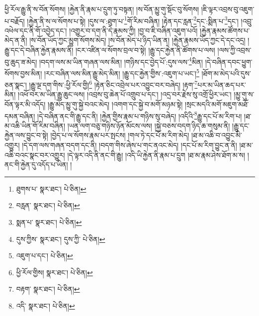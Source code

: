 ཕྱི་རོལ་རྒྱུ་ནི་ས་བོན་སོགས། །རྐྱེན་ནི་རྣམ་པ་དྲུག་ཏུ་བསྟན། །ས་བོན་མྱུ་གུ་སྡོང་བུ་སོགས། །ཇི་ལྟར་འབྲས་བུ་འཇུག་པ་བརྗོད། །རྐྱེན་ནི་ས་ལ་སོགས་པ་སྟེ། །དུས་ལ་:ཐུག་པ་\footnote{ཐུགས་པ་  སྣར་ཐང་།  པེ་ཅིན། }གོ་རིམ་བཞིན། །རྟེན་དང་རླན་\footnote{བརླན་  སྣར་ཐང་།  པེ་ཅིན། }དང་:སྨིན་པ་\footnote{སྨན་པ་  སྣར་ཐང་།  པེ་ཅིན། }དང་། །འབྲུ་འཕེལ་དང་ནི་གོ་འབྱེད་དང་། །འགྱུར་བ་དག་ནི་དེ་རྣམས་ཀྱི། །བྱ་བ་ཇི་བཞིན་འཇུག་པའོ། །རྐྱེན་རྣམས་ཚོགས་པ་མེད་ན་ནི། །ས་བོན་ཡོད་ཀྱང་མྱུག་སོགས་མེད། །ས་བོན་མེད་པ་ཉིད་ཡིན་ན། །རྐྱེན་རྣམས་ཡོད་ཀྱང་དེ་དང་འདྲ། །རྒྱུ་དང་དེ་བཞིན་རྐྱེན་རྣམས་ནི། །ངར་འཛིན་ལ་སོགས་བྲལ་བ་སྟེ། །རྒྱུ་དང་རྐྱེན་ནི་ཚོགས་པ་ལས། །ལས་ཀྱི་འབྲས་བུ་ཆུད་ཟ་མེད། །བདག་ལས་མ་ཡིན་གཞན་ལས་མིན། །གཉིས་དང་བྱེད་པོ་:དུས་ལས་\footnote{དུས་ཀྱིས་  སྣར་ཐང་། དུས་ཀྱི་  པེ་ཅིན། }མིན། །དེ་བཞིན་དབང་ཕྱུག་སོགས་བྱས་མིན། །རང་བཞིན་ལས་མིན་རྒྱུ་མེད་མིན། །རྒྱུ་དང་རྐྱེན་གྱིས་:འཇུག་པ་ཡང་།\footnote{འཇུག་པ་དང་།  པེ་ཅིན། } །ཐོག་མ་མེད་པའི་དུས་ཅན་སྣང་། །རྒྱུ་ལྔ་དག་གིས་:ཕྱི་རོལ་གྱི།\footnote{ཕྱི་རོལ་གྱིས།  སྣར་ཐང་།  པེ་ཅིན། } །རྟེན་ཅིང་འབྲེལ་པར་འབྱུང་བར་བཞེད། །རྟག་\footnote{བརྟག་  སྣར་ཐང་།  པེ་ཅིན། }པར་མ་ཡིན་ཆད་པར་མིན། །འཕོ་བར་མ་ཡིན་རྒྱུ་ཆུང་ལས། །འབྲས་བུ་ཆེན་པོ་འགྲུབ་པ་དང་། །འདྲ་བར་རྗེས་སུ་འགྲོ་ཕྱིར་ཡང་། །མྱུ་གུ་ས་བོན་ལྟར་མི་འདོད། །རྒྱུ་མེད་མྱུ་གུ་སྐྱེ་བའང་མེད། །འགག་དང་སྐྱེ་བ་མགོ་མཉམ་སྟེ། །སྲང་མདའི་མགོ་མཇུག་མཐོ་དམན་བཞིན། །དེ་བཞིན་ནང་གི་རྒྱུ་དང་ནི། །རྐྱེན་གྱིས་རྣམ་པ་གཉིས་སུ་བཞེད། །འདིའི་\footnote{འདི་  སྣར་ཐང་།  པེ་ཅིན། }རྒྱུ་དང་པོ་མ་རིག་པ། །ཐ་མ་འཆི་ཡིན་གོ་རིམ་བཞིན། །ཡན་ལག་བཅུ་གཉིས་ཉོན་མོངས་ལས། །སྐྱེ་བཅས་བདག་ཉིད་ཆ་གསུམ་ནི། །རྒྱུ་དང་རྐྱེན་ལས་བྱུང་བ་སྟེ། །བྱེད་པ་ལ་སོགས་རྣམ་པར་སྤངས། །གལ་ཏེ་དང་པོ་མ་རིག་མེད། །ཐ་མ་འཆི་བ་འབྱུང་མི་འགྱུར། །དེ་དག་ལས་གཞན་བདག་དང་ནི། །བདག་གིས་ཞེས་པ་གང་ནའང་མེད། །དང་པོ་མ་རིག་བྱུང་ན་ནི། །ཐ་མ་འཆི་བའང་སྣང་བར་འགྱུར། །དེ་ལྟར་འདི་ནི་ནང་གི་རྒྱུ། །འདི་ཡི་རྐྱེན་ནི་རྣམ་པ་དྲུག །ཐ་མ་རྣམ་ཤེས་ཐོག་མ་ས། །ནང་གི་རྐྱེན་དུ་འདོད་པ་ཡིན། །
